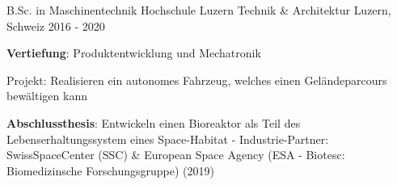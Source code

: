 

\begin{cventries}

\cventry
{B.Sc. in Maschinentechnik} %
{Hochschule Luzern Technik \& Architektur} %
{Luzern, Schweiz} %
{2016 - 2020} %
{
	\begin{cvitems} %
		\item {\textbf{Vertiefung}: Produktentwicklung und Mechatronik}
		\item {Projekt: Realisieren ein autonomes Fahrzeug, welches einen Geländeparcours bewältigen kann}
		\item {\textbf{Abschlussthesis}: Entwickeln einen Bioreaktor als Teil des Lebenserhaltungssystem eines Space-Habitat - \newline Industrie-Partner: \mbox{SwissSpaceCenter} (SSC) \& European Space Agency (ESA - Biotesc: Biomedizinsche Forschungsgruppe) (2019)}
	\end{cvitems}
}




\end{cventries}
